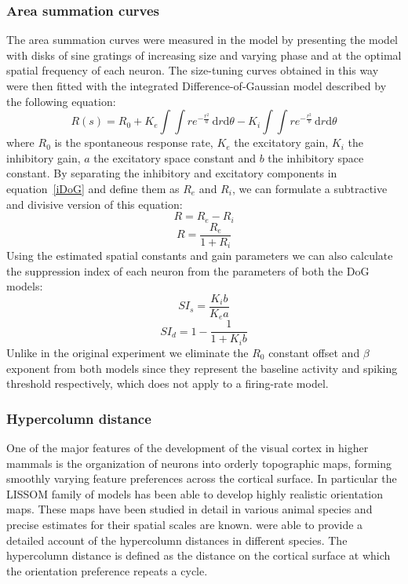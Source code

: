 \subsubsection*{Area summation curves} \label{DoG_Section}

The area summation curves were measured in the model by presenting the
model with disks of sine gratings of increasing size and varying phase
and at the optimal spatial frequency of each neuron. The size-tuning
curves obtained in this way were then fitted with the integrated
Difference-of-Gaussian model described by the following equation:
\begin{equation}
R(s) = R_0 + K_e \int \int re^{-\frac{r^2}{a}} \,
\mathrm{d}r\mathrm{d}\theta - K_i \int\int re^{-\frac{r^2}{b}} \,
\mathrm{d}r\mathrm{d}\theta
\label{iDoG}
\end{equation}
\noindent where $R_0$ is the spontaneous response rate, $K_e$ the
excitatory gain, $K_i$ the inhibitory gain, $a$ the excitatory space
constant and $b$ the inhibitory space constant. By separating the
inhibitory and excitatory components in equation~\ref{iDoG} and define
them as $R_e$ and $R_i$, we can formulate a subtractive and divisive
version of this equation:
\begin{equation}
R = R_e - R_i
\label{DoGSubstractive}
\end{equation}
\begin{equation}
R = \frac{R_e}{1+R_i}
\label{DoGDivisive}
\end{equation}
Using the estimated spatial constants and gain parameters we can also
calculate the suppression index of each neuron from the parameters of
both the DoG models:
\begin{equation}
  SI_s = \frac{K_i b}{K_e a}
\end{equation}
\begin{equation}
  SI_d = 1 - \frac{1}{1+K_i b}
\end{equation}
Unlike in the original experiment \citep{Sceniak2001} we eliminate the
$R_0$ constant offset and $\beta$ exponent from both models since they
represent the baseline activity and spiking threshold respectively,
which does not apply to a firing-rate model.

\subsubsection*{Hypercolumn distance}

One of the major features of the development of the visual cortex in
higher mammals is the organization of neurons into orderly topographic
maps, forming smoothly varying feature preferences across the cortical
surface. In particular the LISSOM family of models has been able to
develop highly realistic orientation maps. These maps have been
studied in detail in various animal species and precise estimates for
their spatial scales are known. \cite{Kaschube2010} were able to
provide a detailed account of the hypercolumn distances in different
species. The hypercolumn distance is defined as the distance on the
cortical surface at which the orientation preference repeats a cycle.

